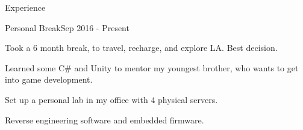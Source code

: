 \documentclass{resume} %
\begin{document}
\begin{rSection}{Experience}

\begin{rSubsection}{Personal Break}{Sep 2016 - Present}{}{}
\item Took a 6 month break, to travel, recharge, and explore LA. Best decision.
\item Learned some C\# and Unity to mentor my youngest brother, who wants to get into game development.
\item Set up a personal lab in my office with 4 physical servers.
\item Reverse engineering software and embedded firmware.
\end{rSubsection}


\end{rSection}
\end{document}
